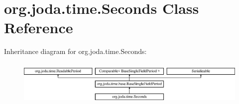 \hypertarget{classorg_1_1joda_1_1time_1_1_seconds}{\section{org.\-joda.\-time.\-Seconds Class Reference}
\label{classorg_1_1joda_1_1time_1_1_seconds}
}
Inheritance diagram for org.\-joda.\-time.\-Seconds\-:\begin{figure}[H]
\begin{center}
\leavevmode
\includegraphics[height=2.187500cm]{classorg_1_1joda_1_1time_1_1_seconds}
\end{center}
\end{figure}
